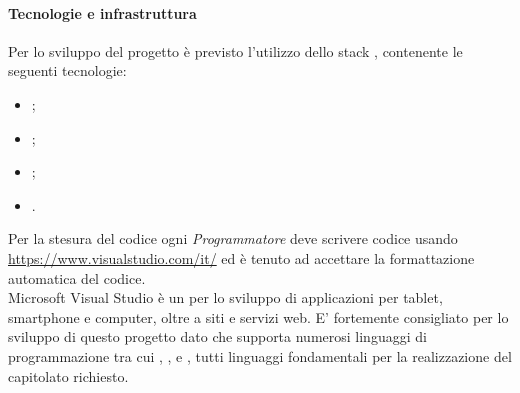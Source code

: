 \paragraph{Tecnologie e infrastruttura}
Per lo sviluppo del progetto è previsto l'utilizzo dello stack , contenente le seguenti tecnologie:
\begin{itemize}
\item {};
\item {};
\item {};
\item {}.
\end{itemize}
Per la stesura del codice ogni \textit{Programmatore} deve scrivere codice usando  \url{https://www.visualstudio.com/it/} ed è tenuto ad accettare la formattazione automatica del codice.\\
Microsoft Visual Studio è un  per lo sviluppo di applicazioni per tablet, smartphone e computer, oltre a siti e servizi web. E' fortemente consigliato per lo sviluppo di questo progetto dato che supporta numerosi linguaggi di programmazione tra cui , ,  e , tutti linguaggi fondamentali per la realizzazione del capitolato richiesto.